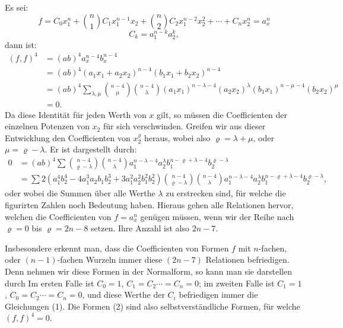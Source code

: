 Es sei:
\[
f = C_0 x_1^n + \binom{n}{1} C_1 x_1^{n-1}x_2 + \binom{n}{2} C_2 x_1^{n-2}x_2^2 + \cdots + C_n x_2^n = a_x^n
\]
\[
C_k = a_1^{n-k}a_2^k,
\]
dann ist:
\[
\begin{aligned}
(f,f)^4 &= (ab)^4 a_x^{n-4}b_x^{n-4}\\
&= (ab)^4 (a_1x_1+a_2x_2)^{n-4}(b_1x_1+b_2x_2)^{n-4}\\
&= (ab)^4 \sum_{\lambda,\mu}\binom{n-4}{\mu}\binom{n-4}{\lambda}(a_1x_1)^{n-\lambda-4}(a_2x_2)^\lambda(b_1x_1)^{n-\mu-4}(b_2x_2)^\mu\\
&= 0.
\end{aligned}
\]
Da diese Identit\"at f\"ur jeden Werth von $x$ gilt, so m\"ussen die
Coefficienten der einzelnen Potenzen von $x_2$ f\"ur sich verschwinden.
Greifen wir aus dieser Entwicklung den Coefficienten von $x_2^\varrho$
heraus, wobei also $\varrho = \lambda + \mu$, oder $\mu = \varrho - \lambda$.
Er ist dargestellt durch:
\[
\begin{aligned}
0 &= (ab)^4 \sum \binom{n-4}{\varrho-\lambda}\binom{n-4}{\lambda} a_1^{n-\lambda-4}a_2^\lambda b_1^{n-\varrho+\lambda-4}b_2^{\varrho-\lambda}\\
&= \sum 2\left(a_1^4b_2^4 - 4a_1^3a_2b_1b_2^3 + 3a_1^2a_2^2b_1^2b_2^2\right)\binom{n-4}{\varrho-\lambda}\binom{n-4}{\lambda} a_1^{n-\lambda-4}a_2^\lambda b_1^{n-\varrho+\lambda-4}b_2^{\varrho-\lambda},
\end{aligned}
\]
oder
wobei die Summen \"uber alle Werthe $\lambda$ zu erstrecken sind, f\"ur
welche die figurirten Zahlen noch Bedeutung haben. Hieraus gehen alle
Relationen hervor, welchen die Coefficienten von $f = a_x^n$ gen\"ugen
m\"ussen, wenn wir der Reihe nach $\varrho = 0$ bis $\varrho = 2n-8$ setzen.
Ihre Anzahl ist also $2n-7$.

Insbesondere erkennt man, dass die Coefficienten von Formen $f$ mit
$n$-fachen, oder $(n-1)$-fachen Wurzeln immer diese $(2n-7)$ Relationen
befriedigen. Denn nehmen wir diese Formen in der Normalform, so kann
man sie darstellen durch
Im ersten Falle ist $C_0 = 1$, $C_1 = C_2 \cdots = C_n = 0$;
im zweiten Falle ist $C_1 = 1$, $C_0 = C_2 \cdots = C_n = 0$,
und diese Werthe der $C_i$ befriedigen immer die Gleichungen (1). Die
Formen (2) sind also selbstverst\"andliche Formen, f\"ur welche
$(f,f)^4 = 0$.


